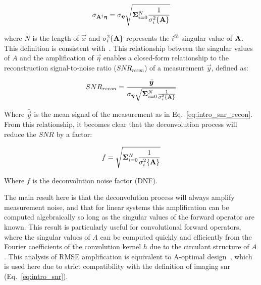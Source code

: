 \begin{equation}\label{eq:intro_noise_amplification}
    \sigma_{\mathbf{A}^{\dagger}\bm{\eta}} = \sigma_{\bm{\eta}} \sqrt{\mathbf{\Sigma}_{i=0}^N{\frac{1}{\sigma_i^2\{\mathbf{A}\}}}}
\end{equation}

\noindent where $N$ is the length of $\vec{x}$ and $\sigma_i^2 \{\mathbf{A}\}$ represents the $i^{th}$ singular value of $\mathbf{A}$. This definition is consistent with~\cite{agrawal2009optimal}. This relationship between the singular values of $A$ and the amplification of $\vec{\eta}$ enables a closed-form relationship to the reconstruction signal-to-noise ratio ($SNR_{recon}$) of a measurement $\vec{y}$, defined as:

\begin{equation}\label{eq:intro_snr_recon}
SNR_{recon} = \frac{\bar{\bm{y}}}{\sigma_{\bm{\eta}} \sqrt{\mathbf{\Sigma}_{i=0}^N{\frac{1}{\sigma_i^2\{\mathbf{A}\}}}}}
\end{equation}

Where $\bar{\vec{y}}$ is the mean signal of the measurement as in Eq.~\ref{eq:intro_snr_recon}. From this relationship, it becomes clear that the deconvolution process will reduce the $SNR$ by a factor:

\begin{equation}\label{eq:intro_dnf}
    f = \sqrt{\mathbf{\Sigma}_{i=0}^N{\frac{1}{\sigma_i^2\{\mathbf{A}\}}}}
\end{equation}

Where $f$ is the deconvolution noise factor (DNF).

The main result here is that the deconvolution process will always amplify measurement noise, and that for linear systems this amplification can be computed algebraically so long as the singular values of the forward operator are known. This result is particularly useful for convolutional forward operators, where the singular values of $A$ can be computed quickly and efficiently from the Fourier coefficients of the convolution kernel $h$ due to the circulant structure of $A$. This analysis of RMSE amplification is equivalent to A-optimal design~\cite{chernoff1953locally}, which is used here due to strict compatibility with the definition of imaging snr (Eq.~\ref{eq:intro_snr}).

